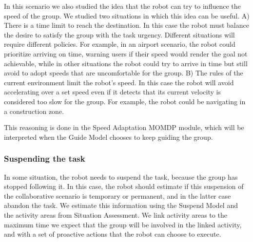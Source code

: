 In this scenario we also studied the idea that the robot can try to influence the speed of the group. We studied two situations in which this idea can be useful. A) There is a time limit to reach the destination. In this case the robot must balance the desire to satisfy the group with the task urgency. Different situations will require different policies. For example, in an airport scenario, the robot could prioritize arriving on time, warning users if their speed would render the goal not achievable, while in other situations the robot could try to arrive in time but still avoid to adopt speeds that are uncomfortable for the group. B) The rules of the current environment limit the robot's speed. In this case the robot will avoid accelerating over a set speed even if it detects that its current velocity is considered too slow for the group. For example, the robot could be navigating in a construction zone.

This reasoning is done in the Speed Adaptation MOMDP module, which will be interpreted when the Guide Model chooses to keep guiding the group.

\subsubsection{Suspending the task}
In some situation, the robot needs to suspend the task, because the group has stopped following it. In this case, the robot should estimate if this suspension of the collaborative scenario is temporary or permanent, and in the latter case abandon the task. We estimate this information using the Suspend Model and the activity areas from Situation Assessment. We link activity areas to the maximum time we expect that the group will be involved in the linked activity, and with a set of proactive actions that the robot can choose to execute.

